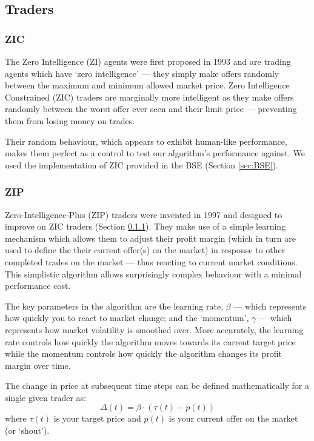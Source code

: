 \documentclass[preprint]{acm_proc_article-sp} %
\begin{document}
\subsection{Traders} \label{sec:traders}
\subsubsection{ZIC} \label{sec:traders_ZIC}
The Zero Intelligence (ZI) agents were first proposed in 1993\cite{ZIC_paper} and are trading agents 
which have `zero intelligence' --- they simply make offers randomly between the maximum and minimum 
allowed market price. Zero Intelligence Constrained (ZIC) traders are marginally more intelligent as 
they make offers randomly between the worst offer ever seen and their limit price --- preventing them 
from losing money on trades.

Their random behaviour, which appears to exhibit human-like performance\cite[p.~1]{ZIP_paper1}, 
makes them perfect as a control to test our algorithm's performance against. We used the 
implementation of ZIC provided in the BSE (Section \ref{sec:BSE}).\\


\subsubsection{ZIP} \label{sec:traders_ZIP}
Zero-Intelligence-Plus (ZIP) traders were invented in 1997 and designed to improve on ZIC traders 
(Section \ref{sec:traders_ZIC})\cite{ZIP_paper1}. They make use of a simple learning mechanism which 
allows them to adjust their profit margin (which in turn are used to define the their current 
offer(s) on the market) in response to other completed trades on the market --- thus reacting to 
current market conditions. This simplistic algorithm allows surprisingly complex behaviour with a 
minimal performance cost.

The key parameters in the algorithm are the learning rate, $\beta$ --- which represents how quickly 
you to react to market change; and the `momentum', $\gamma$ --- which represents how market 
volatility is smoothed over. More accurately, the learning rate controls how quickly the algorithm 
moves towards its current target price while the momentum controls how quickly the algorithm changes 
its profit margin over time.

The change in price at subsequent time steps can be defined mathematically for a single given trader as:
\begin{equation}
\Delta(t) = \beta \cdot ( \tau(t) - p(t))
\end{equation}
where $\tau(t)$ is your target price and $p(t)$ is your current offer on the market (or `shout').
\end{document}
